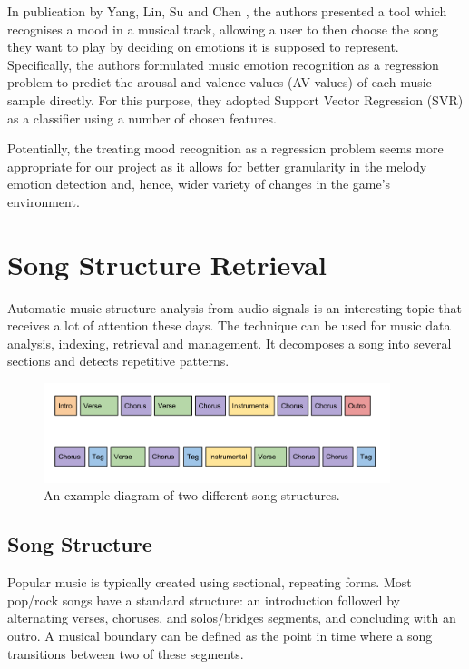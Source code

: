 In publication by Yang, Lin, Su and Chen \cite{mood}, the authors presented a tool which recognises a mood in a musical track, allowing a user to then choose the song they want to play by deciding on emotions it is supposed to represent. Specifically, the authors formulated music emotion recognition as a regression problem to predict the arousal and valence values (AV values) of each music sample directly. For this purpose, they adopted Support Vector Regression (SVR) as a classifier using a number of chosen features.

Potentially, the treating mood recognition as a regression problem seems more appropriate for our project as it allows for better granularity in the melody emotion detection and, hence, wider variety of changes in the game's environment.

\vspace{20pt}

\section{Song Structure Retrieval}

Automatic music structure analysis from audio signals is an interesting topic that receives a lot of attention these days. The technique can be used for music data analysis, indexing, retrieval and management. It decomposes a song into several sections and detects repetitive patterns.

\begin{figure}[h]
	\centering
   \includegraphics[width=0.9\textwidth]{Figures/songstructure}
  \caption{An example diagram of two different song structures.}
\end{figure}


\vspace{10pt}

\subsection{Song Structure}


Popular music is typically created using sectional, repeating forms. 
Most pop/rock songs have a standard structure: an introduction followed by alternating verses, choruses, and solos/bridges segments, and concluding with an outro. A musical boundary can be defined as the point in time where a song transitions between two of these segments.

